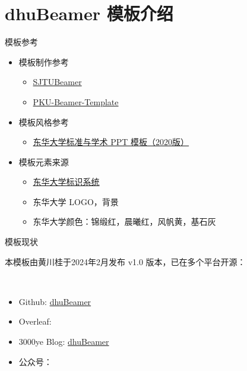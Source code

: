 \documentclass[12pt]{beamer}
\begin{document}
\section{dhuBeamer 模板介绍}
\begin{frame}{模板参考}

    \begin{itemize}
        \item 模板制作参考
        \begin{itemize}
            \item \href{https://github.com/sjtug/SJTUBeamer}{SJTUBeamer}
            \item \href{https://www.overleaf.com/latex/templates/bei-da-zhong-wen-mo-ban-pku-beamer-template/kfxpbtzrqhrn}{PKU-Beamer-Template}
        \end{itemize}
        \item 模板风格参考
        \begin{itemize}
            \item \href{https://www.dhu.edu.cn/_upload/article/files/d2/8c/2137ec0c44238fd6fbd3ee28ff07/9f9b566a-67f1-4717-991f-477ee5b43acb.zip}{东华大学标准与学术 PPT 模板（2020版）}
        \end{itemize}
        \item 模板元素来源
        \begin{itemize}
            \item \href{https://www.dhu.edu.cn/bsxt/listm.htm}{东华大学标识系统}
            \item 东华大学 LOGO，背景
            \item 东华大学颜色：锦缎红，晨曦红，风帆黄，基石灰
        \end{itemize}
    \end{itemize}

\end{frame}

\begin{frame}{模板现状}

    本模板由黄川桂于2024年2月发布 v1.0 版本，已在多个平台开源：

    ~\par

    \begin{itemize}
        \item Github: \href{https://github.com/3000ye/dhuBeamer}{dhuBeamer}
        \item Overleaf: 
        \item 3000ye Blog: \href{https://3000ye.com/p/dhubeamer/}{dhuBeamer}
        \item 公众号：
    \end{itemize}

\end{frame}
\end{document}
